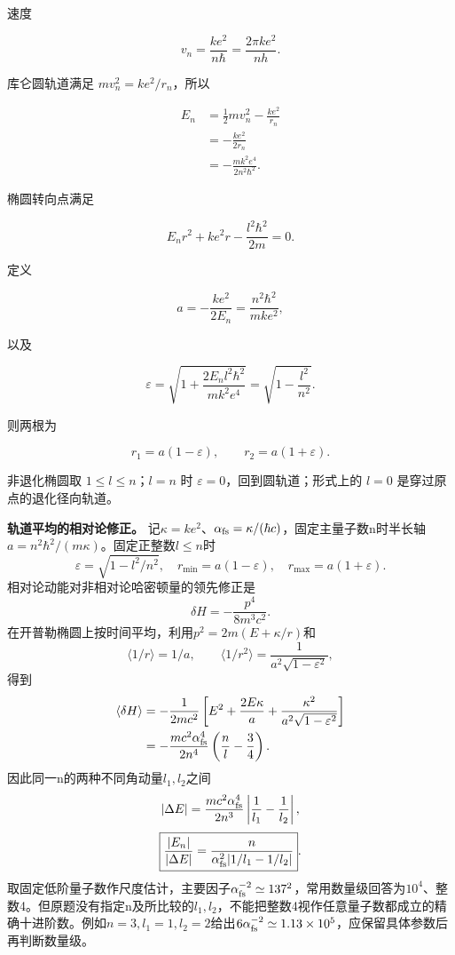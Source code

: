 \documentclass[12pt,a4paper,UTF8]{ctexart}
\begin{document}
速度

\[
\boxed{
v_n=\frac{ke^2}{n\hbar}
=\frac{2\pi ke^2}{nh}}. \tag{4}
\]

库仑圆轨道满足 \(mv_n^2=ke^2/r_n\)，所以

\[
\begin{aligned}
E_n
&=\frac12mv_n^2-\frac{ke^2}{r_n}\\
&=-\frac{ke^2}{2r_n}\\
&=\boxed{-\frac{mk^2e^4}{2n^2\hbar^2}}.
\end{aligned} \tag{5}
\]

椭圆转向点满足

\[
E_nr^2+ke^2r-\frac{l^2\hbar^2}{2m}=0. \tag{6}
\]

定义

\[
a=-\frac{ke^2}{2E_n}
=\frac{n^2\hbar^2}{mke^2}, \tag{7}
\]

以及

\[
\varepsilon
=\sqrt{1+\frac{2E_nl^2\hbar^2}{mk^2e^4}}
=\sqrt{1-\frac{l^2}{n^2}}. \tag{8}
\]

则两根为

\[
\boxed{r_1=a(1-\varepsilon)},\qquad
\boxed{r_2=a(1+\varepsilon)}. \tag{9}
\]

非退化椭圆取 \(1\le l\le n\)；\(l=n\) 时
\(\varepsilon=0\)，回到圆轨道；形式上的 \(l=0\)
是穿过原点的退化径向轨道。

\textbf{轨道平均的相对论修正。}
记\(\kappa=ke^2\)、\(\alpha_{\rm fs}=\kappa/(\hbar c)\)，固定主量子数n时半长轴\(a=n^2\hbar^2/(m\kappa)\)。固定正整数\(l\le n\)时
\[\varepsilon=\sqrt{1-l^2/n^2},\quad r_{\min}=a(1-\varepsilon),\quad r_{\max}=a(1+\varepsilon).\]
相对论动能对非相对论哈密顿量的领先修正是
\[\delta H=-\frac{p^4}{8m^3c^2}.\]
在开普勒椭圆上按时间平均，利用\(p^2=2m(E+\kappa/r)\)和
\[\langle1/r\rangle=1/a,\qquad
\langle1/r^2\rangle=\frac1{a^2\sqrt{1-\varepsilon^2}},\] 得到
\[\begin{aligned}
\langle\delta H\rangle
&=-\frac1{2mc^2}\left[E^2+\frac{2E\kappa}a+
\frac{\kappa^2}{a^2\sqrt{1-\varepsilon^2}}\right]\\
&=-\frac{mc^2\alpha_{\rm fs}^4}{2n^4}
\left(\frac nl-\frac34\right).
\end{aligned}\] 因此同一n的两种不同角动量\(l_1,l_2\)之间
\[|\Delta E|=\frac{mc^2\alpha_{\rm fs}^4}{2n^3}
\left|\frac1{l_1}-\frac1{l_2}\right|,\]
\[\boxed{\frac{|E_n|}{|\Delta E|}
=\frac{n}{\alpha_{\rm fs}^2|1/l_1-1/l_2|}}.\]
取固定低阶量子数作尺度估计，主要因子\(\alpha_{\rm fs}^{-2}\simeq137^2\)，常用数量级回答为\(10^4\)、整数4。但原题没有指定n及所比较的\(l_1,l_2\)，不能把整数4视作任意量子数都成立的精确十进阶数。例如\(n=3,l_1=1,l_2=2\)给出\(6\alpha_{\rm fs}^{-2}\simeq1.13\times10^5\)，应保留具体参数后再判断数量级。
\end{document}

